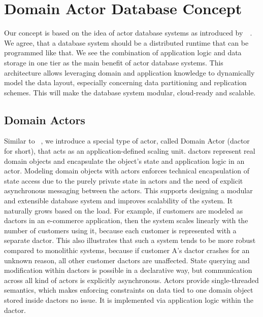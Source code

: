 
\section{Domain Actor Database Concept}\label{sec:concept}
  Our concept is based on the idea of actor database systems as introduced by~\citeauthor{manifesto}~\cite{manifesto}.
  We agree, that a database system should be a distributed runtime that can be programmed like that.
  We see the combination of application logic and data storage in one tier as the main benefit of actor database systems.
  This architecture allows leveraging domain and application knowledge to dynamically model the data layout, especially concerning data partitioning and replication schemes.
  This will make the database system modular, cloud-ready and scalable.

  \subsection{Domain Actors}\label{sec:dactors}
    Similar to \citeauthor{Shah:reactdb}~\cite{Shah:reactdb}, we introduce a special type of actor, called Domain Actor (\gls{dactor} for short), that acts as an application-defined scaling unit.
    \glspl{dactor} represent real domain objects and encapsulate the object's state and application logic in an actor.
    Modeling domain objects with actors enforces technical encapsulation of state access due to the purely private state in actors and the need of explicit asynchronous messaging between the actors.
    This supports designing a modular and extensible database system and improves scalability of the system.
    It naturally grows based on the load.
    For example, if customers are modeled as \glspl{dactor} in an e-commerce application, then the system scales linearly with the number of customers using it, because each customer is represented with a separate \gls{dactor}.
    This also illustrates that such a system tends to be more robust compared to monolithic systems, because if customer A's \gls{dactor} crashes for an unknown reason, all other customer \glspl{dactor} are unaffected.
    State querying and modification within \glspl{dactor} is possible in a declarative way, but communication across all kind of actors is explicitly asynchronous.
    Actors provide single-threaded semantics, which makes enforcing constraints on data tied to one domain object stored inside \glspl{dactor} no issue.
    It is implemented via application logic within the \gls{dactor}.

